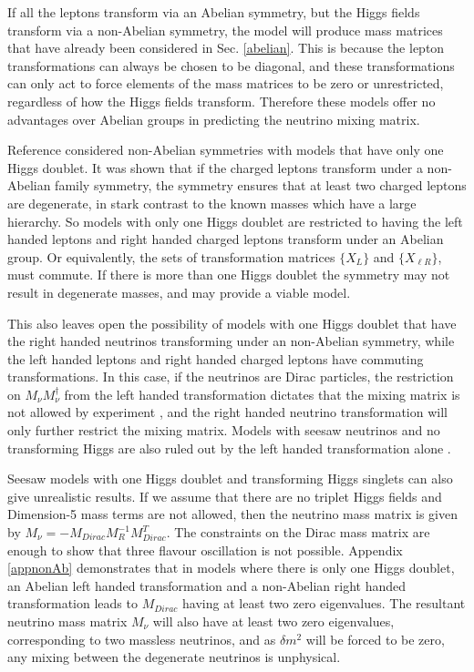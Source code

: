 \documentclass[nofootinbib,showpacs]{revtex4}
\begin{document}
If all the leptons transform via an Abelian symmetry, but the Higgs fields transform via a non-Abelian symmetry, the model will produce mass matrices that have already been considered in Sec. \ref{abelian}. This is because the lepton transformations can always be chosen to be diagonal, and these transformations can only act to force elements of the mass matrices to be zero or unrestricted, regardless of how the Higgs fields transform. Therefore these models offer no advantages over Abelian groups in predicting the neutrino mixing matrix. 


Reference \cite{nogo1} considered non-Abelian symmetries with models that have only one Higgs doublet. It was shown that if the charged leptons transform under a non-Abelian family symmetry, the symmetry ensures that at least two charged leptons are degenerate, in stark contrast to the known masses which have a large hierarchy.  So models with only one Higgs doublet are restricted to having the left handed leptons and right handed charged leptons transform under an Abelian group. Or equivalently, the sets of transformation matrices $\{X_L\}$ and $\{X_{\ell R}\}$, must commute. 
If there is more than one Higgs doublet the symmetry may not result in degenerate masses, and may provide a viable model.

This also leaves open the possibility of models with one Higgs doublet that have the right handed neutrinos transforming under an non-Abelian symmetry, while the left handed leptons and right handed charged leptons have commuting transformations.  In this case, if the neutrinos are Dirac particles, the restriction on $M_\nu M_\nu^\dagger$ from the left handed transformation dictates that the mixing matrix is not allowed by experiment \cite{nogo1}, and the right handed neutrino transformation will only further restrict the mixing matrix. Models with seesaw neutrinos and no transforming Higgs are also ruled out by the left handed transformation alone \cite{nogo1}.

Seesaw models with one Higgs doublet and transforming Higgs singlets can also give unrealistic results. If we assume that there are no triplet Higgs fields and Dimension-5 mass terms are not allowed, then the neutrino mass matrix is given by $M_\nu=-M_{Dirac} M_R^{-1} M_{Dirac}^T$. The constraints on the Dirac mass matrix are enough to show that three flavour oscillation is not possible. Appendix \ref{appnonAb} demonstrates that in models where there is only one Higgs doublet, an Abelian left handed transformation and a non-Abelian right handed transformation leads to $M_{Dirac}$ having at least two zero eigenvalues. The resultant neutrino mass matrix $M_\nu$ will also have at least two zero eigenvalues, corresponding to two massless neutrinos, and as $\delta m^2$ will be forced to be zero, any mixing between the degenerate neutrinos is unphysical. 
\end{document}
